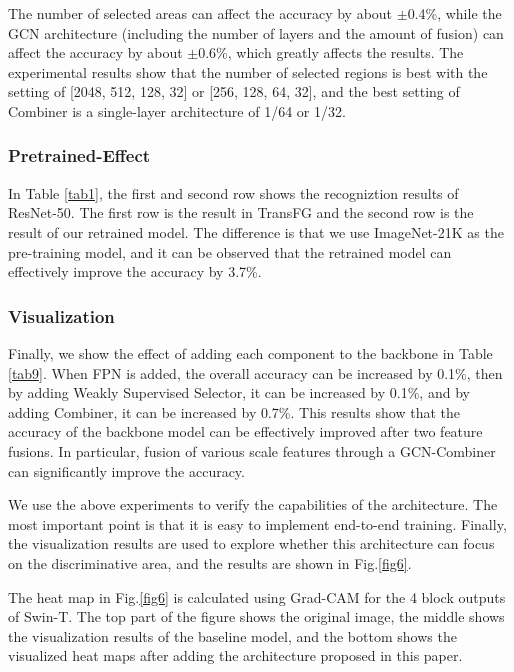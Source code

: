 \documentclass[conference]{IEEEtran}
\begin{document}
The number of selected areas can affect the accuracy by about $\pm$0.4\%, while the GCN architecture (including the number of layers and the amount of fusion) can affect the accuracy by about $\pm$0.6\%, which greatly affects the results. The experimental results show that the number of selected regions is best with the setting of [2048, 512, 128, 32] or [256, 128, 64, 32], and the best setting of Combiner is a single-layer architecture of 1/64 or 1/32.


\subsubsection{Pretrained-Effect}

In Table \ref{tab1}, the first and second row shows the recogniztion results of ResNet-50. The first row is the result in TransFG\cite{TransFG} and the second row is the result of our retrained model. The difference is that we use ImageNet-21K as the pre-training model, and it can be observed that the retrained model can effectively improve the accuracy by 3.7\%.

\subsubsection{Visualization}

Finally, we show the effect of adding each component to the backbone in Table \ref{tab9}. When FPN is added, the overall accuracy can be increased by 0.1\%, then by adding Weakly Supervised Selector, it can be increased by 0.1\%, and by adding Combiner, it can be increased by 0.7\%. This results show that the accuracy of the backbone model can be effectively improved after two feature fusions. In particular, fusion of various scale features through a GCN-Combiner can significantly improve the accuracy.

We use the above experiments to verify the capabilities of the architecture. The most important point is that it is easy to implement end-to-end training. Finally, the visualization results are used to explore whether this architecture can focus on the discriminative area, and the results are shown in Fig.\ref{fig6}.

The heat map in Fig.\ref{fig6} is calculated using Grad-CAM for the 4 block outputs of Swin-T. The top part of the figure shows the original image, the middle shows the visualization results of the baseline model, and the bottom shows the visualized heat maps after adding the architecture proposed in this paper.
\end{document}

